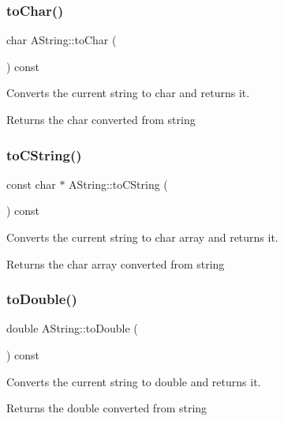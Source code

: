 \subsubsection{\texorpdfstring{toChar()}{toChar()}}
{\footnotesize\ttfamily char A\+String\+::to\+Char (\begin{DoxyParamCaption}{ }\end{DoxyParamCaption}) const}



Converts the current string to char and returns it. 

\begin{DoxyReturn}{Returns}
the char converted from string 
\end{DoxyReturn}
\mbox{\label{class_a_string_ab0a1fc558e39014f0feffc055c1fa47b}} 
\subsubsection{\texorpdfstring{toCString()}{toCString()}}
{\footnotesize\ttfamily const char $\ast$ A\+String\+::to\+C\+String (\begin{DoxyParamCaption}{ }\end{DoxyParamCaption}) const}



Converts the current string to char array and returns it. 

\begin{DoxyReturn}{Returns}
the char array converted from string 
\end{DoxyReturn}
\mbox{\label{class_a_string_ad44ce14af9b6948b4be656e5ccafa0b8}} 
\subsubsection{\texorpdfstring{toDouble()}{toDouble()}}
{\footnotesize\ttfamily double A\+String\+::to\+Double (\begin{DoxyParamCaption}{ }\end{DoxyParamCaption}) const}



Converts the current string to double and returns it. 

\begin{DoxyReturn}{Returns}
the double converted from string 
\end{DoxyReturn}
\mbox{\label{class_a_string_a101d529c5dfb9803eac440e6f3819cda}} 
